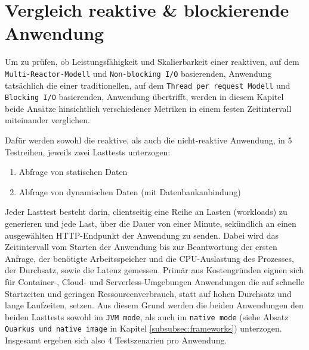 \section {Vergleich reaktive \& blockierende Anwendung}
\label{section:vergleich_reaktiv_blockierend}
Um zu prüfen, ob Leistungsfähigkeit und Skalierbarkeit einer reaktiven, auf dem \newline
\verb|Multi-Reactor-Modell| und \verb|Non-blocking I/O| basierenden,
Anwendung tatsächlich die einer traditionellen, auf dem \verb|Thread per request Modell| und \verb|Blocking I/O| basierenden, Anwendung übertrifft, werden in
diesem Kapitel beide Ansätze hinsichtlich verschiedener Metriken in einem festen Zeitintervall miteinander verglichen.

Dafür werden sowohl die reaktive, als auch die nicht-reaktive Anwendung, in 5 Testreihen, jeweils zwei Lasttests unterzogen:
\begin{enumerate}
  \item Abfrage von statischen Daten
  \item Abfrage von dynamischen Daten (mit Datenbankanbindung)
\end{enumerate}
Jeder Lasttest besteht darin, clientseitig eine Reihe an Lasten (workloads) zu generieren und jede Last, über die Dauer von einer Minute,
sekündlich an einen ausgewählten HTTP-Endpunkt der Anwendung zu senden.
Dabei wird das Zeitintervall vom Starten der Anwendung bis zur Beantwortung der ersten Anfrage,
der benötigte Arbeitsspeicher und die CPU-Auslastung des Prozesses, der Durchsatz, sowie die Latenz gemessen.
Primär aus Kostengründen eignen sich für Container-, Cloud- und Serverless-Umgebungen Anwendungen die
auf schnelle Startzeiten und geringen Ressourcenverbrauch, statt auf hohen Durchsatz und lange Laufzeiten, setzen.
Aus diesem Grund werden die beiden Anwendungen den beiden Lasttests sowohl im \verb|JVM mode|, als auch im \verb|native mode|
(siehe Absatz \verb|Quarkus und native image| in Kapitel \ref{subsubsec:frameworks})
unterzogen. Insgesamt ergeben sich also 4 Testszenarien pro Anwendung.

